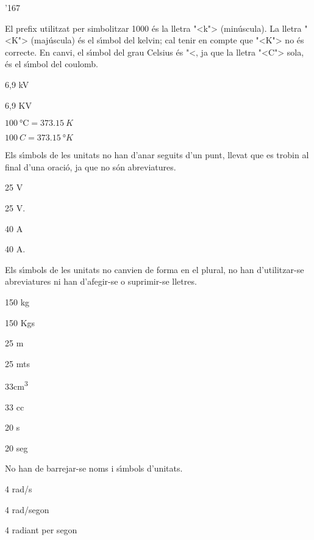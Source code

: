 \begin{dinglist}{'167}

\item El prefix utilitzat per simbolitzar 1000 \'{e}s la lletra {"<}k{">} (min\'{u}scula).  La lletra {"<}K{">} (maj\'{u}scula) \'{e}s el s\'{\i}mbol del  kelvin; cal tenir en compte que {"<}\degree K{">}  no \'{e}s correcte. En canvi, el s\'{\i}mbol del grau Celsius \'{e}s {"<}, ja que la lletra {"<}C{">} sola, \'{e}s el s\'{\i}mbol del coulomb.

\textcolor{Green}{} 6,9  kV

\textcolor{Red}{} 6,9 KV

\textcolor{Green}{} $\SI{100}{\celsius} = \SI{373,15}{K}$

\textcolor{Red}{} $\SI{100}{C} = \SI{373,15}{\degree K}$

\item Els s\'{\i}mbols de les unitats no han d'anar seguits d'un punt, llevat que es trobin al final d'una oraci\'{o}, ja que no s\'{o}n
abreviatures.

\textcolor{Green}{} 25 V

\textcolor{Red}{} 25 V.

\textcolor{Green}{}  40 A

\textcolor{Red}{}  40 A.


\item Els s\'{\i}mbols de les unitats no canvien de forma en el plural, no han
d'utilitzar-se abreviatures ni han d'afegir-se o suprimir-se
lletres.

\textcolor{Green}{} 150 kg

\textcolor{Red}{} 150 Kgs

\textcolor{Green}{} 25 m

\textcolor{Red}{} 25 mts

\textcolor{Green}{} 33\unit{cm^3}

\textcolor{Red}{} 33 cc

\textcolor{Green}{} 20 s

\textcolor{Red}{} 20 seg


\item No han de barrejar-se noms i s\'{\i}mbols d'unitats.

\textcolor{Green}{} 4 rad/s

\textcolor{Red}{} 4 rad/segon

\textcolor{Green}{} 4 radiant per segon


\end{dinglist}

